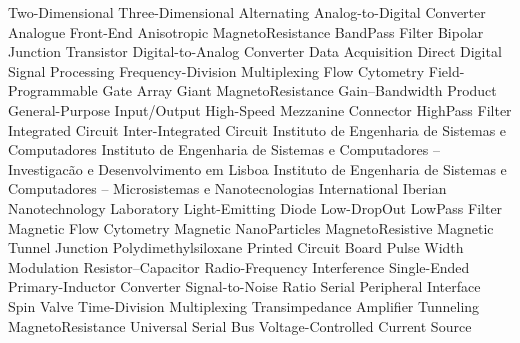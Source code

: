 
\begin{acronym}[H.264/SVC]
     {Two-Dimensional}
     {Three-Dimensional}
     {Alternating}
     {Analog-to-Digital Converter}
     {Analogue Front-End}
     {Anisotropic MagnetoResistance}
     {BandPass Filter}
     {Bipolar Junction Transistor}
     {Digital-to-Analog Converter}
     {Data Acquisition}
     {Direct}
     {Digital Signal Processing}
     {Frequency-Division Multiplexing}
     {Flow Cytometry}
     {Field-Programmable Gate Array}
     {Giant MagnetoResistance}
     {Gain–Bandwidth Product}
     {General-Purpose Input/Output}
     {High-Speed Mezzanine Connector}
     {HighPass Filter}
     {Integrated Circuit}
     {Inter-Integrated Circuit}
     {Instituto de Engenharia de Sistemas e Computadores}
     {Instituto de Engenharia de Sistemas e Computadores -- Investigacão e Desenvolvimento em Lisboa}
     {Instituto de Engenharia de Sistemas e Computadores -- Microsistemas e Nanotecnologias}
     {International Iberian Nanotechnology Laboratory}
     {Light-Emitting Diode}
     {Low-DropOut}
     {LowPass Filter}
     {Magnetic Flow Cytometry}
     {Magnetic NanoParticles}
     {MagnetoResistive}
     {Magnetic Tunnel Junction}
     {Polydimethylsiloxane}
     {Printed Circuit Board}
     {Pulse Width Modulation}
     {Resistor–Capacitor}
     {Radio-Frequency Interference}
     {Single-Ended Primary-Inductor Converter}
     {Signal-to-Noise Ratio}
     {Serial Peripheral Interface}
     {Spin Valve}
     {Time-Division Multiplexing}
     {Transimpedance Amplifier}
     {Tunneling MagnetoResistance}
     {Universal Serial Bus}
     {Voltage-Controlled Current Source}
\end{acronym}